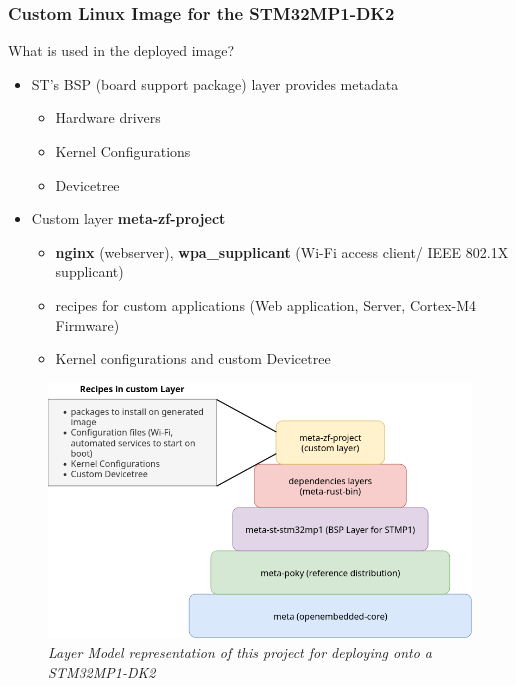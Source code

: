 \documentclass[8pt,compress]{beamer}
\newcommand\DarkBold[1]{\textcolor{VSBlueDark}{\textbf{#1}}}
\newcommand\DarkBoldP[1]{\textcolor{VSPurpleDark}{\textbf{#1}}}
\begin{document}
\begin{frame}
  \frametitle{Custom Linux Image for the STM32MP1-DK2}
  \begin{minipage}{0.475\textwidth}
    \begin{block}{What is used in the deployed image?}
      \begin{itemize}
        \item ST's BSP (board support package) layer provides metadata 
          \begin{itemize}
            \small
            \item Hardware drivers
            \item Kernel Configurations
            \item Devicetree
          \end{itemize}
        \item Custom layer \DarkBoldP{meta-zf-project}
          \begin{itemize}
            \small
            \item \DarkBold{nginx} (webserver), \DarkBold{wpa\_supplicant} (Wi-Fi access client/
              IEEE 802.1X supplicant)
            \item recipes for custom applications (Web application, Server, Cortex-M4 Firmware)
            \item Kernel configurations and custom Devicetree
          \end{itemize}
      \end{itemize}
    \end{block}
  \end{minipage}
  \hfill
  \begin{minipage}{0.5\textwidth}
    \begin{figure}
      \includegraphics[width=1.125\textwidth]{assets/diagrams/layers.png}
      \caption{\it Layer Model representation of this project for deploying onto a 
      STM32MP1-DK2}
    \end{figure}
  \end{minipage}
\end{frame}
\end{document}
